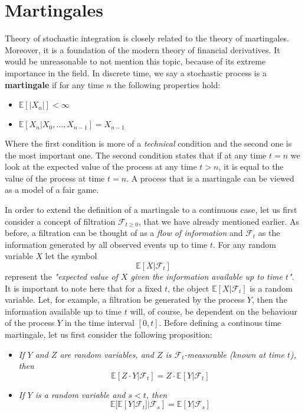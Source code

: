 \documentclass[times, utf8, diplomski]{fer}
\begin{document}
\section{Martingales}
Theory of stochastic integration is closely related to the theory of martingales. Moreover, it is a foundation of the modern theory of financial derivatives. It would be unreasonable to not mention this topic, because of its extreme importance in the field. In discrete time, we say a stochastic process is a \textbf{martingale} if for any time $n$ the following properties hold:

\begin{center}
	\begin{itemize}
		\item $\mathbb{E}[|X_n|] < \infty$
		\item $\mathbb{E}[X_n | X_0, ..., X_{n-1}] = X_{n-1}$
	\end{itemize}
\end{center}

Where the first condition is more of a \textit{technical} condition and the second one is the most important one. The second condition states that if at any time $t=n$ we look at the expected value of the process at any time $t>n$, it is equal to the value of the process at time $t=n$. A process that is a martingale can be viewed as a model of a fair game.

\noindent In order to extend the definition of a martingale to a continuous case, let us first consider a concept of filtration ${\mathcal{F}}_{t \ge 0}$, that we have already mentioned earlier. As before, a filtration can be thought of as a \textit{flow of information} and $\mathcal{F}_t$ as the information generated by all observed events up to time $t$. For any random variable $X$ let the symbol
$$\mathbb{E}[X|\mathcal{F}_t]$$
represent the \textit{"expected value of $X$ given the information available up to time $t$"}. It is important to note here that for a fixed $t$, the object $\mathbb{E}[X|\mathcal{F}_t]$ is a random variable. Let, for example, a filtration be generated by the process $Y$, then the information available up to time $t$ will, of course, be dependent on the behaviour of the process $Y$ in the time interval $[0,t]$. Before defining a continous time martingale, let us first consider the following proposition:

\begin{itemize}
	\item \textit{If $Y$ and $Z$ are random variables, and $Z$ is $\mathcal{F}_t$-measurable (known at time $t$), then} $$\mathbb{E}[Z\cdot Y|\mathcal{F}_t] = Z \cdot \mathbb{E}[Y|\mathcal{F}_t]$$
	\item \textit{If $Y$ is a random variable and $s<t$, then} $$\mathbb{E}[\mathbb{E}[Y|\mathcal{F}_t]|\mathcal{F}_s] = \mathbb{E}[Y|\mathcal{F}_s]$$
\end{itemize}
\end{document}
